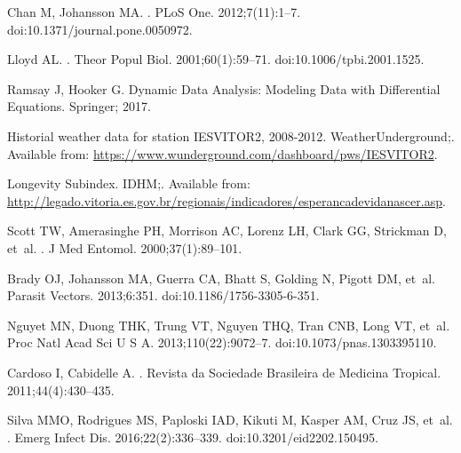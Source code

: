\documentclass[10pt,letterpaper]{article}
\begin{document}
\begin{thebibliography}{10}
Chan M, Johansson MA.
.
\newblock PLoS One. 2012;7(11):1--7.
\newblock doi:{10.1371/journal.pone.0050972}.

Lloyd AL.
.
\newblock Theor Popul Biol. 2001;60(1):59--71.
\newblock doi:{10.1006/tpbi.2001.1525}.

Ramsay J, Hooker G.
\newblock Dynamic Data Analysis: Modeling Data with Differential Equations.
\newblock Springer; 2017.

Historial weather data for station IESVITOR2, 2008-2012.
\newblock WeatherUnderground;.
\newblock Available from:
  \url{https://www.wunderground.com/dashboard/pws/IESVITOR2}.

Longevity Subindex.
\newblock IDHM;.
\newblock Available from:
  \url{http://legado.vitoria.es.gov.br/regionais/indicadores/esperancadevidanascer.asp}.

Scott TW, Amerasinghe PH, Morrison AC, Lorenz LH, Clark GG, Strickman D, et~al.
.
\newblock J Med Entomol. 2000;37(1):89--101.

Brady OJ, Johansson MA, Guerra CA, Bhatt S, Golding N, Pigott DM, et~al.
\newblock Parasit Vectors. 2013;6:351.
\newblock doi:{10.1186/1756-3305-6-351}.

Nguyet MN, Duong THK, Trung VT, Nguyen THQ, Tran CNB, Long VT, et~al.
\newblock Proc Natl Acad Sci U S A. 2013;110(22):9072--7.
\newblock doi:{10.1073/pnas.1303395110}.

Cardoso I, Cabidelle A.
.
\newblock Revista da Sociedade Brasileira de Medicina Tropical.
  2011;44(4):430--435.

Silva MMO, Rodrigues MS, Paploski IAD, Kikuti M, Kasper AM, Cruz JS, et~al.
.
\newblock Emerg Infect Dis. 2016;22(2):336--339.
\newblock doi:{10.3201/eid2202.150495}.


\end{thebibliography}
\end{document}
